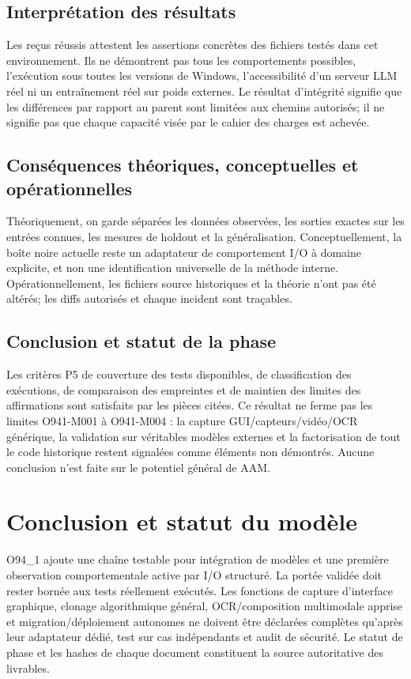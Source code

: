 \documentclass[11pt,a4paper]{article}
\begin{document}
\subsection{Interprétation des résultats}
Les reçus réussis attestent les assertions concrètes des fichiers testés dans cet environnement. Ils ne démontrent pas tous les comportements possibles, l'exécution sous toutes les versions de Windows, l'accessibilité d'un serveur LLM réel ni un entraînement réel sur poids externes. Le résultat d'intégrité signifie que les différences par rapport au parent sont limitées aux chemins autorisés; il ne signifie pas que chaque capacité visée par le cahier des charges est achevée.

\subsection{Conséquences théoriques, conceptuelles et opérationnelles}
Théoriquement, on garde séparées les données observées, les sorties exactes sur les entrées connues, les mesures de holdout et la généralisation. Conceptuellement, la boîte noire actuelle reste un adaptateur de comportement I/O à domaine explicite, et non une identification universelle de la méthode interne. Opérationnellement, les fichiers source historiques et la théorie n'ont pas été altérés; les diffs autorisés et chaque incident sont traçables.

\subsection{Conclusion et statut de la phase}
Les critères P5 de couverture des tests disponibles, de classification des exécutions, de comparaison des empreintes et de maintien des limites des affirmations sont satisfaits par les pièces citées. Ce résultat ne ferme pas les limites O941-M001 à O941-M004 : la capture GUI/capteurs/vidéo/OCR générique, la validation sur véritables modèles externes et la factorisation de tout le code historique restent signalées comme éléments non démontrés. Aucune conclusion n'est faite sur le potentiel général de AAM.

\section{Conclusion et statut du modèle}
O94\_1 ajoute une chaîne testable pour intégration de modèles et une première observation comportementale active par I/O structuré. La portée validée doit rester bornée aux tests réellement exécutés. Les fonctions de capture d'interface graphique, clonage algorithmique général, OCR/composition multimodale apprise et migration/déploiement autonomes ne doivent être déclarées complètes qu'après leur adaptateur dédié, test sur cas indépendants et audit de sécurité. Le statut de phase et les hashes de chaque document constituent la source autoritative des livrables.
\end{document}
